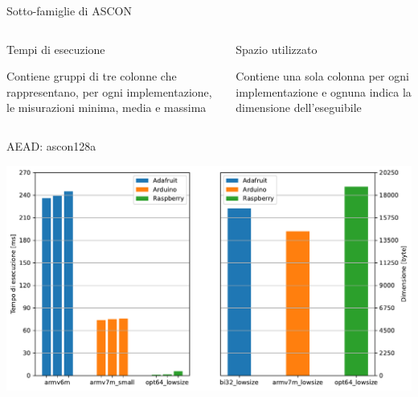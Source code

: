 \begin{frame}{Sotto-famiglie di ASCON}
    \begin{columns}

    \begin{column}{0.5\textwidth}
        \begin{block}{Tempi di esecuzione}
            \begin{center}
                Contiene gruppi di tre colonne che rappresentano, per ogni implementazione, le misurazioni minima, media e massima
            \end{center}
        \end{block}
    \end{column}

    \begin{column}{0.5\textwidth}
        \begin{block}{Spazio utilizzato}
            \begin{center}
                Contiene una sola colonna per ogni implementazione e ognuna indica la dimensione dell'eseguibile
            \end{center}
        \end{block}
    \end{column}
        
    \end{columns}

\end{frame}


\begin{frame}{AEAD: ascon128a}

    \begin{center}
        \includegraphics[height=0.40\textwidth]{images/aead.pdf}
    \end{center}
    
\end{frame}


